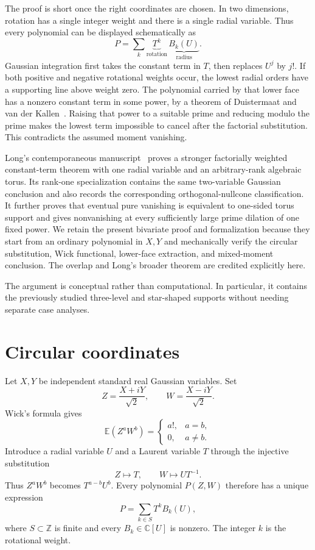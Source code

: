 \documentclass[11pt]{article}
\newcommand{\C}{\mathbb C}
\newcommand{\Z}{\mathbb Z}
\newcommand{\E}{\mathbb E}
\begin{document}
The proof is short once the right coordinates are chosen.  In two
dimensions, rotation has a single integer weight and there is a single
radial variable.  Thus every polynomial can be displayed schematically as
\[
  P=\sum_k \underbrace{T^k}_{\text{rotation}}\,
                  \underbrace{B_k(U)}_{\text{radius}}.
\]
Gaussian integration first takes the constant term in \(T\), then replaces
\(U^j\) by \(j!\).  If both positive and negative rotational weights occur,
the lowest radial orders have a supporting line above weight zero.  The
polynomial carried by that lower face has a nonzero constant term in some
power, by a theorem of Duistermaat and van der Kallen~\cite{DK}.  Raising
that power to a suitable prime and reducing modulo the prime makes the
lowest term impossible to cancel after the factorial substitution.  This
contradicts the assumed moment vanishing.

Long's contemporaneous manuscript~\cite{LongTorus} proves a stronger
factorially weighted constant-term theorem with one radial variable and an
arbitrary-rank algebraic torus.  Its rank-one specialization contains the
same two-variable Gaussian conclusion and also records the corresponding
orthogonal-nullcone classification.  It further proves that eventual pure
vanishing is equivalent to one-sided torus support and gives nonvanishing at
every sufficiently large prime dilation of one fixed power.  We retain the
present bivariate proof and formalization because they start from an ordinary
polynomial in \(X,Y\) and mechanically verify the circular substitution,
Wick functional, lower-face extraction, and mixed-moment conclusion.  The
overlap and Long's broader theorem are credited explicitly here.

The argument is conceptual rather than computational.  In particular, it
contains the previously studied three-level and star-shaped supports
without needing separate case analyses.

\section{Circular coordinates}

Let \(X,Y\) be independent standard real Gaussian variables.  Set
\[
  Z=\frac{X+iY}{\sqrt2},\qquad
  W=\frac{X-iY}{\sqrt2}.
\]
Wick's formula gives
\begin{equation}\label{eq:wick}
  \E(Z^aW^b)=
  \begin{cases}
    a!,&a=b,\\
    0,&a\neq b.
  \end{cases}
\end{equation}
Introduce a radial variable \(U\) and a Laurent variable \(T\) through the
injective substitution
\[
  Z\longmapsto T,\qquad W\longmapsto UT^{-1}.
\]
Thus \(Z^aW^b\) becomes \(T^{a-b}U^b\).  Every polynomial \(P(Z,W)\)
therefore has a unique expression
\begin{equation}\label{eq:weight-decomposition}
  P=\sum_{k\in S}T^kB_k(U),
\end{equation}
where \(S\subset\Z\) is finite and every \(B_k\in\C[U]\) is nonzero.  The
integer \(k\) is the rotational weight.
\end{document}
